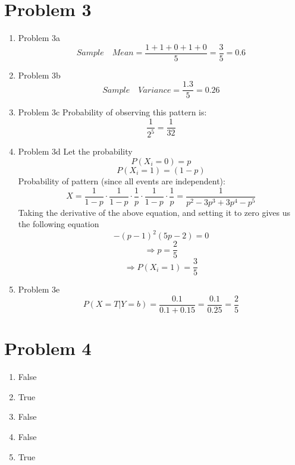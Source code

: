 \documentclass[11pt]{article}
\newcommand{\solution}[1]{{{\color{blue}{\bf Solution:} {#1}}}}
\begin{document}
\newpage

\section{Problem 3}
\begin{enumerate}

\item Problem 3a \newline
\solution{}
$$
Sample\quad Mean = \frac{1 + 1 + 0 + 1 + 0}{5} = \frac{3}{5} = 0.6
$$


\item Problem 3b \newline
\solution{}
$$
Sample\quad Variance = \frac{1.3}{5} = 0.26
$$

\item Problem 3c \newline
\solution{}
Probability of observing this pattern is:
$$
\frac{1}{2^5} = \frac{1}{32}
$$

\item Problem 3d \newline
\solution{}
Let the probability 
$$
P(X_{i} = 0) = p
$$
$$
P(X_{i} = 1) = (1 - p)
$$
Probability of pattern (since all events are independent):
$$
X = \frac{1}{1-p} \cdot \frac{1}{1-p} \cdot \frac{1}{p} \cdot \frac{1}{1-p} \cdot \frac{1}{p} = \frac{1}{p^2 - 3p^3 + 3p^4 - p^5}
$$
Taking the derivative of the above equation, and setting it to zero gives us the following equation
$$
- {(p-1)}^2 (5p - 2) = 0
$$
$$
\Rightarrow p = \frac{2}{5}
$$
$$
\Rightarrow P(X_{i} = 1) = \frac{3}{5}
$$

\item Problem 3e \newline
\solution{}
$$
P(X = T | Y = b) = \frac{0.1}{0.1 + 0.15} = \frac{0.1}{0.25} = \frac{2}{5}
$$
\end{enumerate}

\newpage
\section{Problem 4}
\begin{enumerate}

\item 
\solution{}
False

\item 
\solution{}
True

\item 
\solution{}
False

\item 
\solution{}
False

\item
\solution{}
True

\end{enumerate}
\end{document}
